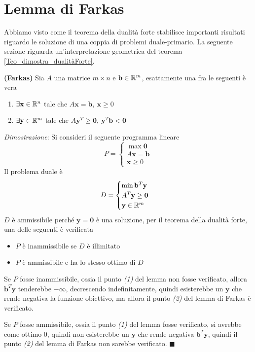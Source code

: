 \documentclass[10pt, letterpaper]{report}
\begin{document}
\section{Lemma di Farkas}
Abbiamo visto come il teorema della dualità forte stabilisce importanti risultati riguardo le soluzione di una coppia di problemi duale-primario. La seguente sezione riguarda un'interpretazione geometrica del teorema \ref{Teo_dimostra_dualitàForte}.
\begin{lemma2}
    \textbf{(Farkas)} Sia $A$ una matrice $m\times n$ e $\mathbf b \in {\mathbb R}^m$, esattamente una fra le seguenti è vera \begin{enumerate}
        \item $\exists \mathbf x \in {\mathbb R}^n$ tale che $A\mathbf x = \mathbf b, \ \mathbf x \ge 0$
        \item $\exists \mathbf y \in {\mathbb R}^m$ tale che $A\mathbf y^T\ge \mathbf0, \ \mathbf y^T\mathbf b<\mathbf 0$
    \end{enumerate}
\end{lemma2}
\textit{Dimostrazione}: Si consideri il seguente programma lineare 
$$P=\begin{cases}
    \max \mathbf 0 \\ 
    A\mathbf{x}=\mathbf b \\ 
    \mathbf x\ge 0
\end{cases}$$
Il problema duale è 
$$D=\begin{cases}
    \min \mathbf b^T\mathbf y \\ 
    A^T\mathbf{y}\ge \mathbf 0 \\ 
    \mathbf y\in {\mathbb R}^m
\end{cases}$$
$D$ è ammissibile perché $\mathbf y = \mathbf 0$ è una soluzione, per il teorema della dualità forte, una delle seguenti è verificata\begin{itemize}
    \item $P$ è inammissibile se $D$ è illimitato 
    \item $P$ è ammissibile e ha lo stesso ottimo di $D$
\end{itemize}
Se $P$ fosse inammissibile,  ossia il punto \textit{(1)} del lemma non fosse verificato,  allora $\mathbf b^T\mathbf y$ tenderebbe $-\infty$, decrescendo indefinitamente, quindi esisterebbe un $\mathbf y$ che rende negativa la funzione obiettivo, ma allora il punto \textit{(2)} del lemma di Farkas è verificato.\bigskip 

Se $P$ fosse ammissibile, ossia il punto \textit{(1)} del lemma fosse verificato, si avrebbe come ottimo 0, quindi non esisterebbe un $\mathbf y$ che rende negativa $\mathbf b^T\mathbf y$, quindi il punto \textit{(2)} del lemma di Farkas non sarebbe verificato.
\hfill$\blacksquare$\bigskip
\end{document}
